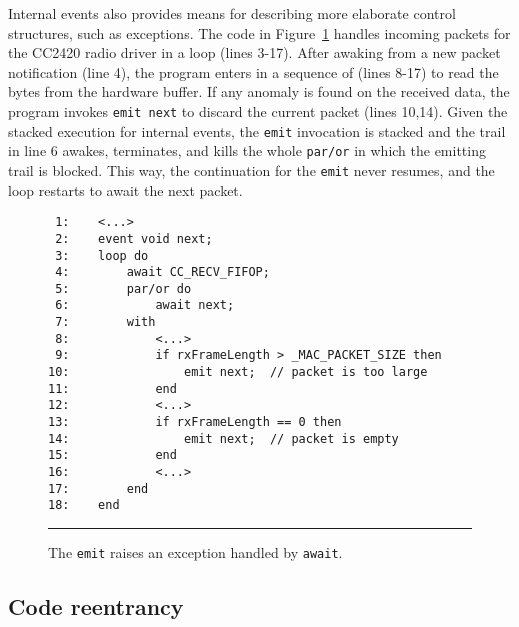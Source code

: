 \documentclass[10pt]{sensys-proc}
\newcommand{\code}[1] {{\small{\texttt{#1}}}}
\begin{document}
Internal events also provides means for describing more elaborate control 
structures, such as exceptions.
The code in Figure~\ref{lst.exception} handles incoming packets for the CC2420 
radio driver in a loop (lines 3-17).
After awaking from a new packet notification (line 4), the program enters in a 
sequence of (lines 8-17) to read the bytes from the hardware buffer.
If any anomaly is found on the received data, the program invokes 
\code{emit~next} to discard the current packet (lines 10,14).
Given the stacked execution for internal events, the \code{emit} invocation is 
stacked and the trail in line 6 awakes, terminates, and kills the whole 
\code{par/or} in which the emitting trail is blocked.
This way, the continuation for the \code{emit} never resumes, and the loop 
restarts to await the next packet.

\begin{figure}[t]
{\small
\begin{verbatim}
 1:    <...>
 2:    event void next;
 3:    loop do
 4:        await CC_RECV_FIFOP;
 5:        par/or do
 6:            await next;
 7:        with
 8:            <...>
 9:            if rxFrameLength > _MAC_PACKET_SIZE then
10:                emit next;  // packet is too large
11:            end
12:            <...>
13:            if rxFrameLength == 0 then
14:                emit next;  // packet is empty
15:            end
16:            <...>
17:        end
18:    end
\end{verbatim}
}
\rule{8.5cm}{0.37pt}
\caption{ The \code{emit} raises an exception handled by \code{await}.
\label{lst.exception}
}
\end{figure}

\subsection{Code reentrancy}
\label{sec.ceu.oo}

\begin{comment}
Objects
    - each method is a global function receiving a different object to 
      manipulate
    - global (usually heap)
    - garbage collected or global

Organisms
    - mutual reactivity
    - scoped / local
    - O(1) GC

- nesting
    - data
    - events
    - listeners
    - compositions

- orgs have body
- objects have methods

- both have an interface
- fields / methods

- fields / internal events
- public fields are ok because reliable shared memory

- no recursive definitions
- but we have interfaces
- special global interface
\end{comment}
\end{document}
